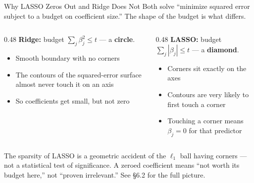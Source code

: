 \documentclass[aspectratio=169, 11pt]{beamer}
\begin{document}
\begin{frame}{Why LASSO Zeros Out and Ridge Does Not}
  Both solve ``minimize squared error subject to a budget on coefficient size.''
  The shape of the budget is what differs.
  \begin{columns}[T]
    \begin{column}{0.48\textwidth}
      \textbf{Ridge:} budget $\sum_j \beta_j^2 \le t$ --- a \textbf{circle}.
      \begin{itemize}\small\itemsep0pt
        \item Smooth boundary with no corners
        \item The contours of the squared-error surface almost never
              touch it on an axis
        \item So coefficients get small, but not zero
      \end{itemize}
    \end{column}
    \begin{column}{0.48\textwidth}
      \textbf{LASSO:} budget $\sum_j |\beta_j| \le t$ --- a \textbf{diamond}.
      \begin{itemize}\small\itemsep0pt
        \item Corners sit exactly on the axes
        \item Contours are very likely to first touch a corner
        \item Touching a corner means $\beta_j = 0$ for that predictor
      \end{itemize}
    \end{column}
  \end{columns}
  \begin{keybox}
    \small The sparsity of LASSO is a geometric accident of the $\ell_1$ ball
    having corners --- not a statistical test of significance. A zeroed
    coefficient means ``not worth its budget here,'' not ``proven irrelevant.''
    See \textcite{James2021} \S6.2 for the full picture.
  \end{keybox}
\end{frame}
\end{document}
